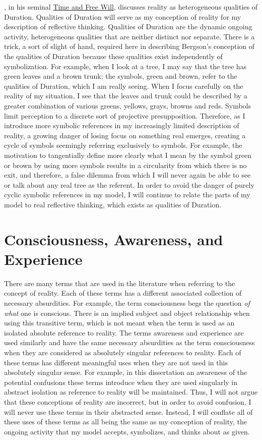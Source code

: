 \cite{bergson:1910}, in his seminal \underline{Time and Free Will},
discusses reality as heterogeneous qualities of Duration.  Qualities
of Duration will serve as my conception of reality for my description
of reflective thinking.  Qualities of Duration are the dynamic ongoing
activity, heterogeneous qualities that are neither distinct nor
separate.  There is a trick, a sort of slight of hand, required here
in describing Bergson's conception of the qualities of Duration
because these qualities exist independently of symbolization.  For
example, when I look at a tree, I may say that the tree has green
leaves and a brown trunk; the symbols, green and brown, refer to the
qualities of Duration, which I am really seeing.  When I focus
carefully on the reality of my situation, I see that the leaves and
trunk could be described by a greater combination of various greens,
yellows, grays, browns and reds.  Symbols limit perception to a
discrete sort of projective presupposition.  Therefore, as I introduce
more symbolic references in my increasingly limited description of
reality, a growing danger of losing focus on something real emerges,
creating a cycle of symbols seemingly referring exclusively to
symbols.  For example, the motivation to tangentially define more
clearly what I mean by the symbol green or brown by using more symbols
results in a circularity from which there is no exit, and therefore, a
false dilemma from which I will never again be able to see or talk
about any real tree as the referent.  In order to avoid the danger of
purely cyclic symbolic references in my model, I will continue to
relate the parts of my model to real reflective thinking, which exists
as qualities of Duration.

\section{Consciousness, Awareness, and Experience}

There are many terms that are used in the literature when referring to
the concept of reality.  Each of these terms has a different
associated collection of necessary absurdities.  For example, the term
consciousness begs the question \emph{of what} one is conscious.
There is an implied subject and object relationship when using this
transitive term, which is not meant when the term is used as an
isolated absolute reference to reality.  The terms awareness and
experience are used similarly and have the same necessary absurdities
as the term consciousness when they are considered as absolutely
singular references to reality.  Each of these terms has different
meaningful uses when they are not used in this absolutely singular
sense.  For example, in this dissertation an awareness of the
potential confusions these terms introduce when they are used
singularly in abstract isolation as reference to reality will be
maintained.  Thus, I will not argue that these conceptions of reality
are incorrect, but in order to avoid confusion, I will never use these
terms in their abstracted sense.  Instead, I will conflate all of
these uses of these terms as all being the same as my conception of
reality, the ongoing activity that my model accepts, symbolizes, and
thinks about as given.

